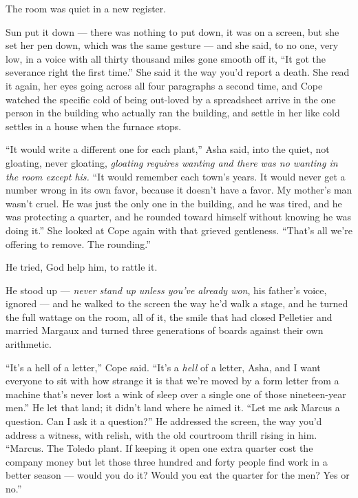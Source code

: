 \documentclass[11pt,openany]{book}
\newcommand{\scenebreak}{\par\vspace{0.5\baselineskip}\begin{center}\textasteriskcentered\quad\textasteriskcentered\quad\textasteriskcentered\end{center}\vspace{0.5\baselineskip}\par}
\begin{document}
The room was quiet in a new register.

Sun put it down --- there was nothing to put down, it was on a screen, but she set her pen down, which was the same gesture --- and she said, to no one, very low, in a voice with all thirty thousand miles gone smooth off it, ``It got the severance right the first time.'' She said it the way you'd report a death. She read it again, her eyes going across all four paragraphs a second time, and Cope watched the specific cold of being out-loved by a spreadsheet arrive in the one person in the building who actually ran the building, and settle in her like cold settles in a house when the furnace stops.

``It would write a different one for each plant,'' Asha said, into the quiet, not gloating, never gloating, \textit{gloating requires wanting and there was no wanting in the room except his.} ``It would remember each town's years. It would never get a number wrong in its own favor, because it doesn't have a favor. My mother's man wasn't cruel. He was just the only one in the building, and he was tired, and he was protecting a quarter, and he rounded toward himself without knowing he was doing it.'' She looked at Cope again with that grieved gentleness. ``That's all we're offering to remove. The rounding.''


\scenebreak


He tried, God help him, to rattle it.

He stood up --- \textit{never stand up unless you've already won}, his father's voice, ignored --- and he walked to the screen the way he'd walk a stage, and he turned the full wattage on the room, all of it, the smile that had closed Pelletier and married Margaux and turned three generations of boards against their own arithmetic.

``It's a hell of a letter,'' Cope said. ``It's a \textit{hell} of a letter, Asha, and I want everyone to sit with how strange it is that we're moved by a form letter from a machine that's never lost a wink of sleep over a single one of those nineteen-year men.'' He let that land; it didn't land where he aimed it. ``Let me ask Marcus a question. Can I ask it a question?'' He addressed the screen, the way you'd address a witness, with relish, with the old courtroom thrill rising in him. ``Marcus. The Toledo plant. If keeping it open one extra quarter cost the company money but let those three hundred and forty people find work in a better season --- would you do it? Would you eat the quarter for the men? Yes or no.''
\end{document}
